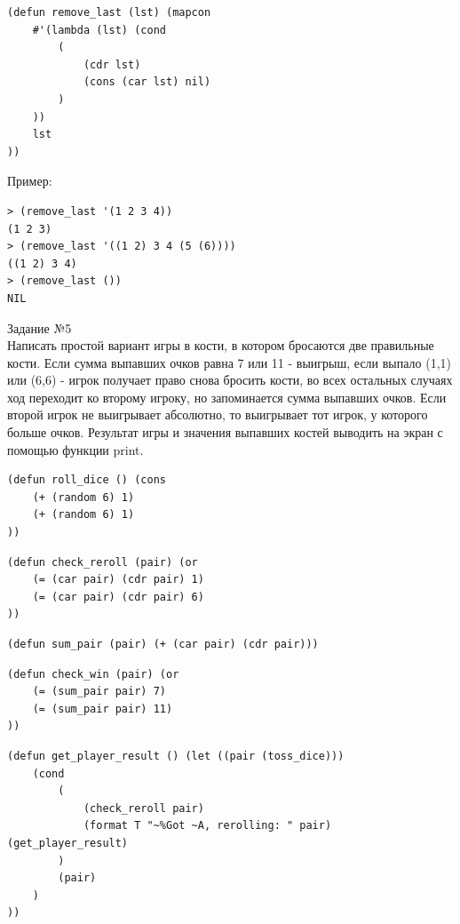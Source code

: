 \newpage
\vspace*{10mm}

\begin{lstlisting}[caption=3-й вариант функции получения спиcка без последнего элемента]
 (defun remove_last (lst) (mapcon 
 	#'(lambda (lst) (cond 
		(
			(cdr lst)
			(cons (car lst) nil)
		)
	))
	lst
))
\end{lstlisting}

Пример:
\begin{lstlisting}
> (remove_last '(1 2 3 4))
(1 2 3)
> (remove_last '((1 2) 3 4 (5 (6))))
((1 2) 3 4)
> (remove_last ())
NIL
\end{lstlisting}

\newpage
\vspace*{10mm}
{\LARGE Задание №5}\\

Написать простой вариант игры в кости, в котором бросаются две правильные кости. Если сумма выпавших очков равна 7 или 11 - выигрыш, если выпало (1,1) или (6,6) - игрок получает право снова бросить кости, во всех остальных случаях ход переходит ко второму игроку, но запоминается сумма выпавших очков. Если второй игрок не выигрывает абсолютно, то выигрывает тот игрок, у которого больше очков. Результат игры и значения выпавших костей выводить на экран с помощью функции print.

\begin{lstlisting}[caption=Функция подбрасывания костей]
(defun roll_dice () (cons 
	(+ (random 6) 1) 
	(+ (random 6) 1)
))
\end{lstlisting}

\begin{lstlisting}[caption=Функция проверки переподбрасывания костей]
(defun check_reroll (pair) (or 
	(= (car pair) (cdr pair) 1) 
	(= (car pair) (cdr pair) 6)
))
\end{lstlisting}

\begin{lstlisting}[caption=Функция суммирования чисел в точечной паре]
(defun sum_pair (pair) (+ (car pair) (cdr pair)))
\end{lstlisting}

\begin{lstlisting}[caption=Функция проверки моментального выигрыша]
(defun check_win (pair) (or 
	(= (sum_pair pair) 7)
	(= (sum_pair pair) 11)
))
\end{lstlisting}
				
\begin{lstlisting}[caption=Функция получения конечного результата подбрасывания]				
(defun get_player_result () (let ((pair (toss_dice))) 
 	(cond
		(
			(check_reroll pair)
			(format T "~%Got ~A, rerolling: " pair) (get_player_result)
		)
		(pair)
	)
))
\end{lstlisting}

